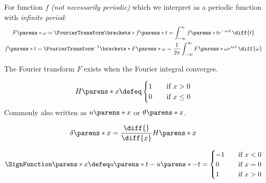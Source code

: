 \begin{multicols}{2}

    \begin{CheatsheetEntryFrame}


        For function $f$ \emph{(not necessarily periodic)} which we interpret as a periodic function with \emph{infinite period}:
        \begin{gather*}
            F\parens*{\omega}
            = \FourierTransform\brackets*{f\parens*{t}}
            = \int_{-\infty}^\infty f\parens*{t} e^{-i \omega t} \,\diff{t}
            \\
            f\parens*{t}
            = \FourierTransform^{-1}\brackets*{F\parens*{\omega}}
            = \frac{1}{2 \pi}
            \int_{-\infty}^\infty F\parens*{\omega} e^{i \omega t} \,\diff{\omega}
        \end{gather*}

        The Fourier transform $F$ exists when the Fourier integral converges.

    \end{CheatsheetEntryFrame}

    \begin{CheatsheetEntryFrame}

        \begin{equation*}
            H\parens*{x}
            \defeq
                \begin{cases}
                    1 &\quad \text{if } x > 0 \\
                    0 &\quad \text{if } x \le 0
                \end{cases}
        \end{equation*}
        Commonly also written as $u\parens*{x}$ or $\theta\parens*{x}$.

        \begin{equation*}
            \delta\parens*{x}
            = \frac{\diff{}}{\diff{x}} H\parens*{x}
        \end{equation*}

    \end{CheatsheetEntryFrame}

    \begin{CheatsheetEntryFrame}

        \begin{equation*}
            \SignFunction\parens*{x}
            \defeq
            u\parens*{t} - u\parens*{-t}
            =
            \begin{cases}
                -1 &\quad \text{if } x < 0 \\
                0  &\quad \text{if } x = 0 \\
                1  &\quad \text{if } x > 0
            \end{cases}
        \end{equation*}


\end{CheatsheetEntryFrame}
\end{multicols}
